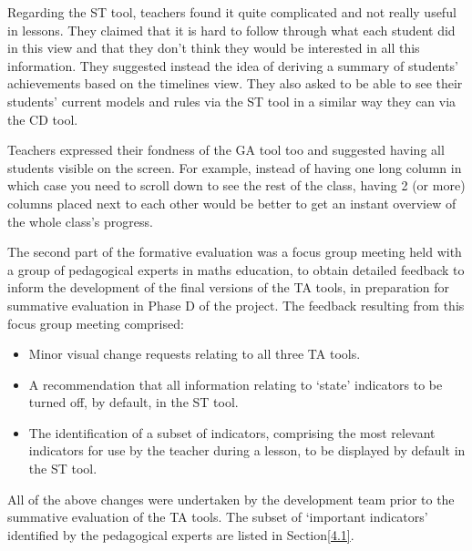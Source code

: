 Regarding the ST tool, teachers found it quite complicated and not
really useful in lessons. They claimed that it is hard to follow
through what each student did in this view and that they don’t think
they would be interested in all this information. They suggested
instead the idea of deriving a summary of students’ achievements based
on the timelines view. They also asked to be able to see their
students’ current models and rules via the ST tool in a similar way
they can via the CD tool.

Teachers expressed their fondness of the GA tool too and suggested
having all students visible on the screen. For example, instead of
having one long column in which case you need to scroll down to see
the rest of the class, having 2 (or more) columns placed next to each
other would be better to get an instant overview of the whole class’s
progress.

The second part of the formative evaluation was a focus group meeting
held with a group of pedagogical experts in maths education, to obtain
detailed feedback to inform the development of the final versions of
the TA tools, in preparation for summative evaluation in Phase D of
the project. The feedback resulting from this focus group meeting
comprised:
\begin{itemize}
\item Minor visual change requests relating to all three TA tools.
\item A recommendation that all information relating to `state’
  indicators to be turned off, by default, in the ST tool. 
\item The identification of a subset of indicators, comprising the
  most relevant indicators for use by the teacher during a lesson, to
  be displayed by default in the ST tool. 
\end{itemize}

All of the above changes were undertaken by the development team prior
to the summative evaluation of the TA tools. The subset of `important
indicators’ identified by the pedagogical experts are listed in
Section\ref{4.1}.


